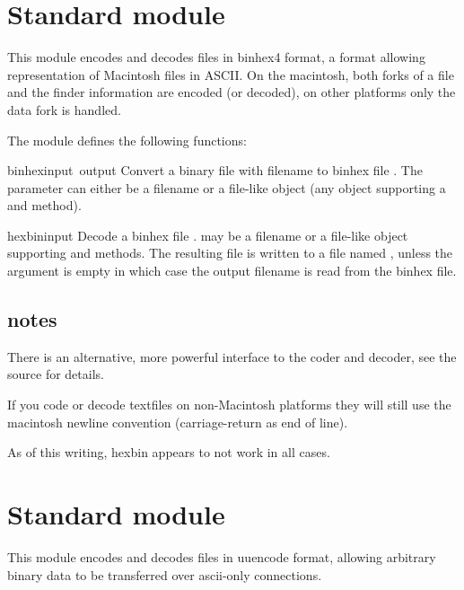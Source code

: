 \section{Standard module }

This module encodes and decodes files in binhex4 format, a format
allowing representation of Macintosh files in ASCII. On the macintosh,
both forks of a file and the finder information are encoded (or
decoded), on other platforms only the data fork is handled.

The  module defines the following functions:

\renewcommand{\indexsubitem}{(in module binhex)}

\begin{funcdesc}{binhex}{input\, output}
Convert a binary file with filename  to binhex file
. The  parameter can either be a filename or a
file-like object (any object supporting a  and 
method).
\end{funcdesc}

\begin{funcdesc}{hexbin}{input}
Decode a binhex file .  may be a filename or a
file-like object supporting  and  methods.
The resulting file is written to a file named , unless the
argument is empty in which case the output filename is read from the
binhex file.
\end{funcdesc}

\subsection{notes}
There is an alternative, more powerful interface to the coder and
decoder, see the source for details.

If you code or decode textfiles on non-Macintosh platforms they will
still use the macintosh newline convention (carriage-return as end of
line).

As of this writing, hexbin appears to not work in all cases.

\section{Standard module }

This module encodes and decodes files in uuencode format, allowing
arbitrary binary data to be transferred over ascii-only connections.

